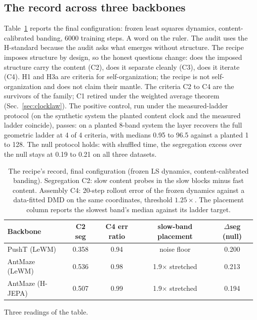 \documentclass[11pt]{article}
\begin{document}
\subsection{The record across three backbones}
\label{sec:record}

Table~\ref{tab:recipe} reports the final configuration: frozen least squares dynamics, content-calibrated banding, 6000 training steps.
A word on the ruler.
The audit uses the H-standard because the audit asks what emerges without structure.
The recipe imposes structure by design, so the honest questions change: does the imposed structure carry the content (C2), does it separate cleanly (C3), does it iterate (C4).
H1 and H3a are criteria for self-organization; the recipe is not self-organization and does not claim their mantle.
The criteria C2 to C4 are the survivors of the family; C1 retired under the weighted average theorem (Sec.~\ref{sec:clocklaw}).
The positive control, run under the measured-ladder protocol (on the synthetic system the planted content clock and the measured ladder coincide), passes: on a planted 8-band system the layer recovers the full geometric ladder at 4 of 4 criteria, with medians 0.95 to 96.5 against a planted 1 to 128.
The null protocol holds: with shuffled time, the segregation excess over the null stays at 0.19 to 0.21 on all three datasets.

\begin{table}[t]
\centering
\caption{The recipe's record, final configuration (frozen LS dynamics, content-calibrated banding). Segregation C2: slow content probes in the slow blocks minus fast content. Assembly C4: 20-step rollout error of the frozen dynamics against a data-fitted DMD on the same coordinates, threshold $1.25 \times$. The placement column reports the slowest band's median against its ladder target.}
\label{tab:recipe}
\begin{tabular}{lcccc}
\toprule
Backbone & C2 seg & C4 err ratio & slow-band placement & $\Delta$seg (null) \\
\midrule
PushT (LeWM) & 0.358 & 0.94 & noise floor & 0.200 \\
AntMaze (LeWM) & 0.536 & 0.98 & 1.9$\times$ stretched & 0.213 \\
AntMaze (H-JEPA) & 0.507 & 0.99 & 1.9$\times$ stretched & 0.194 \\
\bottomrule
\end{tabular}
\end{table}

Three readings of the table.
\end{document}
